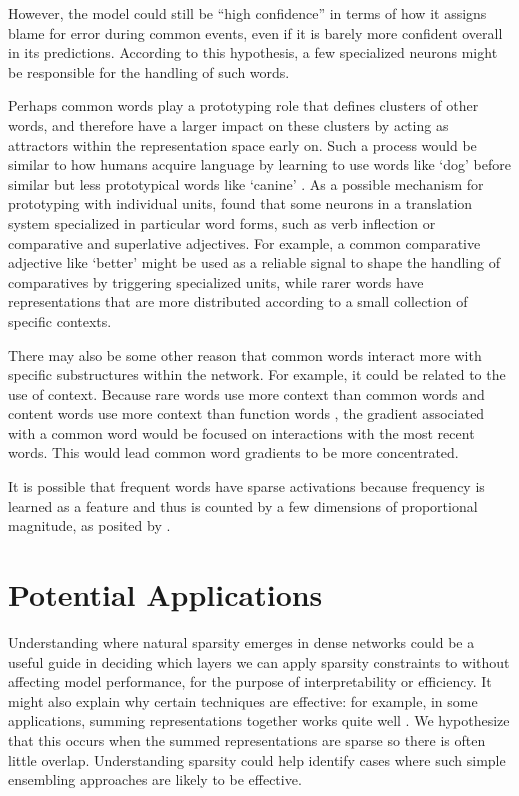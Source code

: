 However, the model could still be ``high confidence'' in terms of how it assigns blame for error during common events, even if it is barely more confident overall in its predictions. According to this hypothesis, a few specialized neurons might be responsible for the handling of such words.

Perhaps common words play a prototyping role that defines clusters of other words, and therefore have a larger impact on these clusters by acting as attractors within the representation space early on. Such a process would be similar to how humans acquire language by learning to use words like `dog' before similar but less prototypical words like `canine' \cite{rosch1999principles}. As a possible mechanism for prototyping with individual units, \citeauthor{dalvi2019one} found that some neurons in a translation system specialized in particular word forms, such as verb inflection or comparative and superlative adjectives.  For example, a common comparative adjective like `better' might be used as a reliable signal to shape the handling of comparatives by triggering specialized units, while rarer words have representations that are more distributed according to a small collection of specific contexts. 

There may also be some other reason that common words interact more with specific substructures within the network. For example, it could be related to the use of context. Because rare words use more context than common words and content words use more context than function words \cite{khandelwal_sharp_2018}, the gradient associated with a common word would be focused on  interactions with the most recent words. This would lead common word gradients to be more concentrated.
    
It is  possible that  frequent words have sparse activations because  frequency  is learned as a feature and thus is counted by a few dimensions of   proportional magnitude, as posited by \citeauthor{li_understanding_2016}. 

\section{Potential Applications}

Understanding where natural sparsity emerges in dense networks could be a useful guide in  deciding which layers we can apply sparsity constraints to without affecting  model performance, for the purpose of interpretability or efficiency. It might also explain why certain techniques are effective: for example, in some applications, summing representations together works quite well \cite{hill2016learning}. We hypothesize that this occurs when the summed representations are sparse so there is often little overlap. Understanding sparsity could help identify cases where such simple ensembling approaches are likely to be effective.

